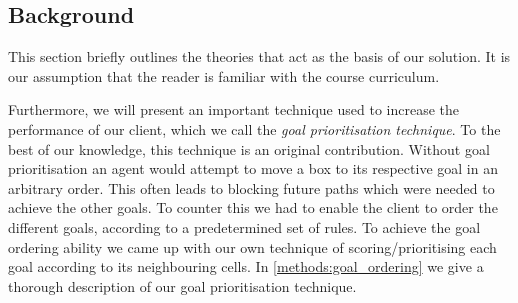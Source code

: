 \subsection{Background}
\label{sec:background}


This section briefly outlines the theories that act as the basis of our solution. 
It is our assumption that the reader is familiar with the course curriculum.



Furthermore, we will present an important technique used to increase the performance of our client, which we call the \emph{goal prioritisation technique}.
To the best of our knowledge, this technique is an original contribution.
Without goal prioritisation an agent would attempt to move a box to its respective goal in an arbitrary order.
This often leads to blocking future paths which were needed to achieve the other goals.
To counter this we had to enable the client to order the different goals, according to a predetermined set of rules.
To achieve the goal ordering ability we came up with our own technique of scoring/prioritising each goal according to its neighbouring cells.
In \cref{methods:goal_ordering} we give a thorough description of our goal prioritisation technique.
